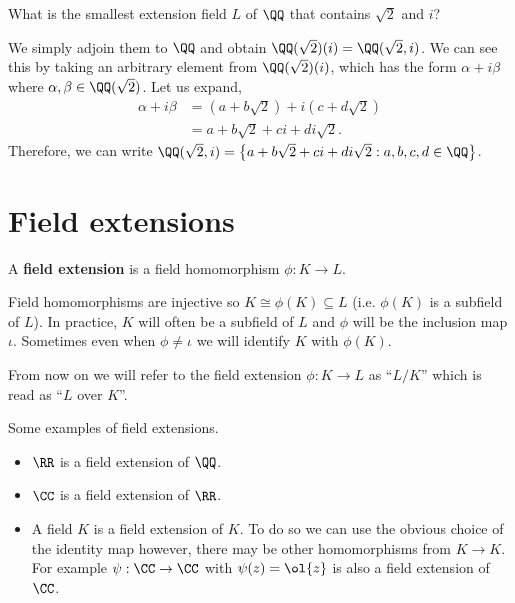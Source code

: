 \documentclass[12pt, a4paper]{article}
\begin{document}
\begin{example}
    What is the smallest extension field \(L\) of \(\QQ\) that contains \(\sqrt{2}\) and \(i\)?
    \begin{solution}
        We simply adjoin them to \(\QQ\) and obtain \(\QQ(\sqrt{2})(i)=\QQ(\sqrt{2},i)\). We can see this by taking an arbitrary element from \(\QQ(\sqrt{2})(i)\), which has the form \(\alpha+i\beta\) where \(\alpha,\beta \in \QQ(\sqrt{2})\). Let us expand,
        \[\begin{aligned}
            \alpha+i\beta &= (a+b\sqrt{2})+i(c+d\sqrt{2}) \\
            &= a+b\sqrt{2}+ci+di\sqrt{2}.
        \end{aligned}\]
        Therefore, we can write \(\QQ(\sqrt{2},i)=\left\{ a+b\sqrt{2}+ci+di\sqrt{2} : a,b,c,d\in \QQ \right\}\).
    \end{solution}
\end{example}

\section{Field extensions}

\begin{definition}
    A \textbf{field extension} is a field homomorphism \(\phi:K\to L\).
\end{definition}

\begin{mdremark}
    Field homomorphisms are injective so \(K \cong \phi(K) \subseteq L\) (i.e. \(\phi(K)\) is a subfield of \(L\)). In practice, \(K\) will often be a subfield of \(L\) and \(\phi\) will be the inclusion map \(\iota\). Sometimes even when \(\phi \neq \iota\) we will identify \(K\) with \(\phi(K)\).
\end{mdremark}

\begin{mdprop}
    From now on we will refer to the field extension \(\phi:K \to L\) as ``\(L/K\)'' which is read as ``\(L\) over \(K\)''. 
\end{mdprop}

\begin{mdexample}
    Some examples of field extensions.
    \begin{itemize}
        \item \(\RR\) is a field extension of \(\QQ\).
        \item \(\CC\) is a field extension of \(\RR\).
        \item A field \(K\) is a field extension of \(K\). To do so we can use the obvious choice of the identity map however, there may be other homomorphisms from \(K \to K\). For example \(\psi:\CC \to \CC\) with \(\psi(z)=\ol{z}\) is also a field extension of \(\CC\).
    \end{itemize}
\end{mdexample}
\end{document}
